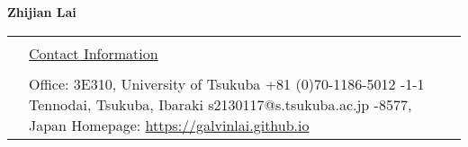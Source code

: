 \documentclass[letterpaper,11pt]{article}
\newcommand{\headingfont}{\LARGE \MakeUppercase }
\newenvironment{SectionTable}[1]{
	\renewcommand*{\arraystretch}{1.0}
	\setlength{\tabcolsep}{10pt}
	\begin{longtable}{Rp{5.2in}} 
		\rule{2.5cm}{4pt} 
		& \underline{#1} \\ %
	}
	{
	\end{longtable}\vspace{-.3cm}
}
\begin{document}
	

\thispagestyle{plain}  %


\begin{center}
	{\Huge \bf Zhijian Lai} 
\end{center}
\begin{SectionTable}{\headingfont Contact Information} 
	&
	Office: 3E310, University of Tsukuba \hfill +81 (0)70-1186-5012 -1-1 Tennodai, Tsukuba, Ibaraki \hfill s2130117@s.tsukuba.ac.jp -8577, Japan  \hfill 
	Homepage: \href{https://galvinlai.github.io}{https://galvinlai.github.io}	
\end{SectionTable}





\end{document}
